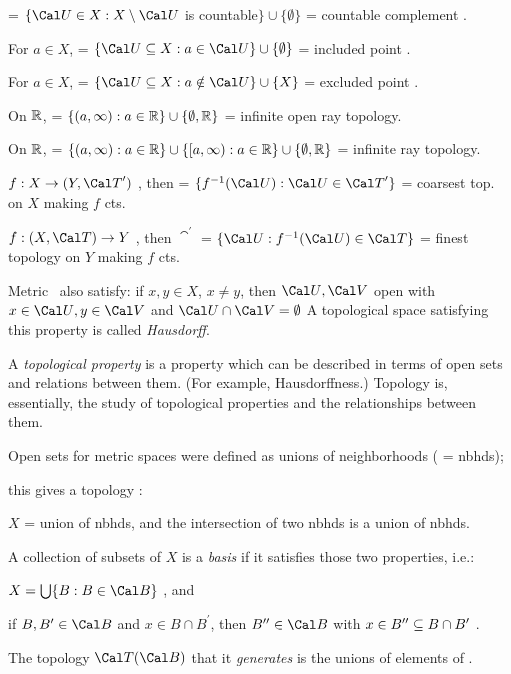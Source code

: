 \catm = $\{\cau\in X : X\smin\cau$ is countable$\}\cup\{\emptyset\}$ = countable complement \top.

 For $a\in X$, \catm = $\{\cau\sset X : a\in\cau\}\cup\{\emptyset\}$ = included point \top.

 For $a\in X$, \catm = $\{\cau\sset X : a\notin\cau\}\cup\{X \}$ = excluded point \top.

On ${\Bbb R}$, \catm = $\{(a,\infty) : a\in{\Bbb R}\}\cup\{\emptyset, {\Bbb R}\}$ = infinite open ray topology.

On ${\Bbb R}$, \catm = $\{(a,\infty) : a\in{\Bbb R}\}\cup\{[a,\infty) : a\in{\Bbb R}\}\cup\{\emptyset, {\Bbb R}\}$ = infinite ray topology.

$f:X\ra (Y,\cat^\prime)$ , then \catm = $\{\finv(\cau) : \cau\in\cat^\prime\}$ = coarsest top. on $X$ making $f$ cts.

$f:(X,\cat)\ra Y$ , then $\cat^\prime$ = $\{\cau : \finv(\cau)\in\cat\}$ = finest topology on $Y$ making $f$ cts.

\msk

\ni Metric \tops\ also satisfy: if $x,y\in X$, $x\neq y$, then \exs $\cau,\cav$ open with $x\in\cau, y\in\cav$ and $\cau\cap\cav=\emptyset$
\hsk A topological space satisfying this property is called {\it Hausdorff}.

A {\it topological property} is a property which can be described in terms of open sets and 
relations between them. (For example, Hausdorffness.) Topology is, essentially, the study 
of topological properties and the relationships between them.

\msk


Open sets for metric spaces were defined as unions of neighborhoods ( = nbhds); 

this gives a topology :

\hsk $X$ = union of nbhds, and the intersection of two nbhds is a union of nbhds.

A collection \cabm of subsets of $X$ is a {\it basis} if it satisfies those two properties, i.e.:

\hsk $X=\bigcup\{B : B\in\cab\}$ , and 

\hsk if $B,B^\prime\in \cab$ and $x\in B\cap B^\prime$, then \exs $B^{\prime\prime}\in\cab$ with
$x\in B^{\prime\prime}\subseteq B\cap B^\prime$ .

The topology $\cat(\cab)$ that it {\it generates} is the unions of elements of \cabm .


